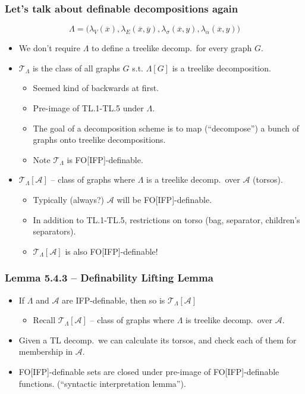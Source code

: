 \documentclass{beamer}
\begin{document}
\begin{frame}
  \frametitle{Let's talk about definable decompositions again}
  \vspace{-5mm}
  \begin{equation*}
    \Lambda = \bigl(\lambda_V(\overline{x}), \lambda_E(\overline{x},
    \overline{y}), \lambda_\sigma(\overline{x}, y),
    \lambda_\alpha(\overline{x}, y)\bigr)
  \end{equation*}
  \begin{itemize}
  \item We don't require $\Lambda$ to define a treelike decomp.\ for every
    graph $G$.  \pause
  \item $\mathcal{T}_{\Lambda}$ is the class of all graphs $G$
    s.t. $\Lambda[G]$ is a treelike decomposition.
    \begin{itemize}
    \item Seemed kind of backwards at first.
    \item Pre-image of TL.1-TL.5 under $\Lambda$.
    \item The goal of a decomposition scheme is to map (``decompose'') a
      bunch of graphs onto treelike decompositions.
      \pause
    \item Note $\mathcal{T}_{\Lambda}$ is FO[IFP]-definable.
    \end{itemize}
    \pause
  \item $\mathcal{T}_{\Lambda}[\mathcal{A}]$ -- class of graphs where
    $\Lambda$ is a treelike decomp.\ over $\mathcal{A}$ (torsos).
    \begin{itemize}
    \item Typically (always?) $\mathcal{A}$ will be FO[IFP]-definable.
    \item In addition to TL.1-TL.5, restrictions on torso (bag, separator,
      children's separators).
      \pause
    \item $\mathcal{T}_{\Lambda}[\mathcal{A}]$ is also FO[IFP]-definable!
    \end{itemize}
  \end{itemize}
\end{frame}

\begin{frame}
  \frametitle{Lemma 5.4.3 -- Definability Lifting Lemma}
  \begin{itemize}
  \item If $\Lambda$ and $\mathcal{A}$ are IFP-definable, then so is
    $\mathcal{T}_{\Lambda}[\mathcal{A}]$
    \begin{itemize}
    \item Recall $\mathcal{T}_{\Lambda}[\mathcal{A}]$ -- class of graphs where
    $\Lambda$ is treelike decomp.\ over $\mathcal{A}$.
    \end{itemize}
  \item Given a TL decomp.\ we can calculate its torsos, and check each of
    them for membership in $\mathcal{A}$.
  \item FO[IFP]-definable sets are closed under pre-image of
    FO[IFP]-definable functions. (``syntactic interpretation lemma'').
  \end{itemize}
\end{frame}
\end{document}
